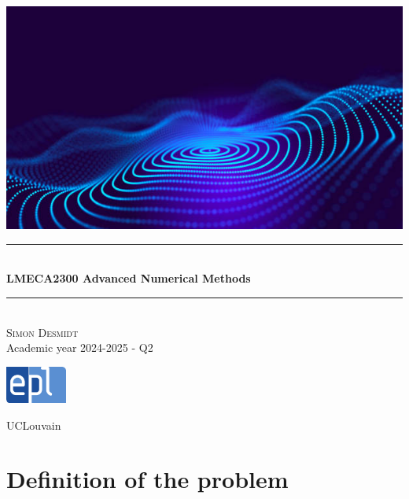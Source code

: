 \documentclass[12pt, openany]{report}
\newcommand{\HRule}{\rule{\linewidth}{0.5mm}}
\theoremstyle{definition}
\begin{document}
\begin{titlepage}
    \begin{sffamily}
    \begin{center}
        \includegraphics[scale=2.5]{img/page_de_garde.png} \\[1cm]
        \HRule \\[0.4cm]
        { \huge \bfseries LMECA2300 Advanced Numerical Methods \\[0.4cm] }
    
        \HRule \\[1.5cm]
        \textsc{\LARGE Simon Desmidt}\\[1cm]
        \vfill
        \vspace{2cm}
        {\large Academic year 2024-2025 - Q2}
        \vspace{0.4cm}
         
        \includegraphics[width=0.15\textwidth]{img/epl.png}
        
        UCLouvain\\
    
    \end{center}
    \end{sffamily}
\end{titlepage}

\setcounter{tocdepth}{1}
\tableofcontents
\chapter{Definition of the problem}
\end{document}
